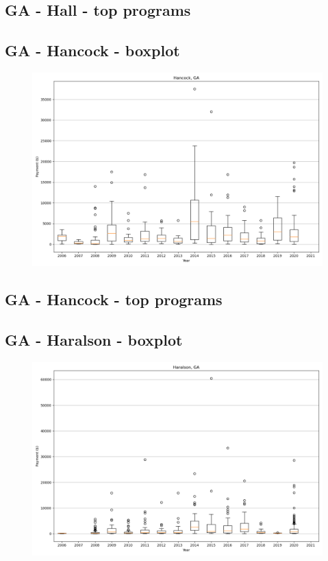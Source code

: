 \subsection*{GA - Hall - top programs}

\newpage
\subsection*{GA - Hancock - boxplot}
\begin{figure}[h]
\centering
\includegraphics[width=7in]{../output/boxplots/counties/Hancock-GA_boxplot.png}
\end{figure}


\subsection*{GA - Hancock - top programs}

\newpage
\subsection*{GA - Haralson - boxplot}
\begin{figure}[h]
\centering
\includegraphics[width=7in]{../output/boxplots/counties/Haralson-GA_boxplot.png}
\end{figure}


